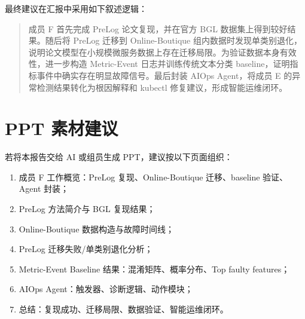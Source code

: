\documentclass[UTF8,a4paper,12pt]{ctexart}
\begin{document}
最终建议在汇报中采用如下叙述逻辑：

\begin{quote}
成员 F 首先完成 PreLog 论文复现，并在官方 BGL 数据集上得到较好结果。随后将 PreLog 迁移到 Online-Boutique 组内数据时发现单类别退化，说明论文模型在小规模微服务数据上存在迁移局限。为验证数据本身有效性，进一步构造 Metric-Event 日志并训练传统文本分类 baseline，证明指标事件中确实存在明显故障信号。最后封装 AIOps Agent，将成员 E 的异常检测结果转化为根因解释和 kubectl 修复建议，形成智能运维闭环。
\end{quote}

\section{PPT 素材建议}

若将本报告交给 AI 或组员生成 PPT，建议按以下页面组织：

\begin{enumerate}[label=\arabic*.]
    \item 成员 F 工作概览：PreLog 复现、Online-Boutique 迁移、baseline 验证、Agent 封装；
    \item PreLog 方法简介与 BGL 复现结果；
    \item Online-Boutique 数据构造与故障时间线；
    \item PreLog 迁移失败/单类别退化分析；
    \item Metric-Event Baseline 结果：混淆矩阵、概率分布、Top faulty features；
    \item AIOps Agent：触发器、诊断逻辑、动作模块；
    \item 总结：复现成功、迁移局限、数据验证、智能运维闭环。
\end{enumerate}
\end{document}
